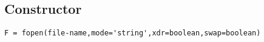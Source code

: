 
\begin{mandesc}
   \\
\end{mandesc}

\subsection*{Constructor}
\label{fopen}
\begin{verbatim}
F = fopen(file-name,mode='string',xdr=boolean,swap=boolean)
\end{verbatim}
